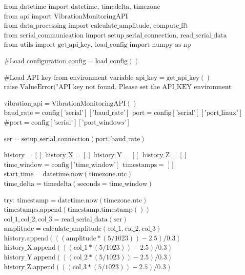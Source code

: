 \begin{algorithmic}[1]
	\STATE $\text{from datetime import datetime, timedelta, timezone}$
	\STATE $\text{from api import VibrationMonitoringAPI}$
	\STATE $\text{from data\_processing import calculate\_amplitude, compute\_fft}$
	\STATE $\text{from serial\_communication import setup\_serial\_connection, read\_serial\_data}$
	\STATE $\text{from utils import get\_api\_key, load\_config}$
	\STATE $\text{import numpy as np}$
	
	\STATE
	\STATE $\text{\# Load configuration}$
	\STATE $\text{config} = \text{load\_config}()$
	
	\STATE $\text{\# Load API key from environment variable}$
	\STATE $\text{api\_key} = \text{get\_api\_key}()$
	\STATE $\text{raise ValueError("API key not found. Please set the API\_KEY environment variable.")}$
	\ENDIF
	
	\STATE $\text{vibration\_api} = \text{VibrationMonitoringAPI}()$
	\STATE $\text{baud\_rate} = \text{config}[\text{'serial'}][\text{'baud\_rate'}]$
	\STATE $\text{port} = \text{config}[\text{'serial'}][\text{'port\_linux'}]$
	\STATE $\text{\# port} = \text{config}[\text{'serial'}][\text{'port\_windows'}]$
	
	\STATE $\text{ser} = \text{setup\_serial\_connection}(\text{port}, \text{baud\_rate})$
	
	\STATE $\text{history} = [ ]$
	\STATE $\text{history\_X} = [ ]$
	\STATE $\text{history\_Y} = [ ]$
	\STATE $\text{history\_Z} = [ ]$
	\STATE $\text{time\_window} = \text{config}[\text{'time\_window'}]$
	\STATE $\text{timestamps} = [ ]$
	\STATE $\text{start\_time} = \text{datetime.now}(\text{timezone.utc})$
	\STATE $\text{time\_delta} = \text{timedelta}(\text{seconds} = \text{time\_window})$
	
	\STATE
	\STATE $\text{try:}$
	\STATE $\text{timestamp} = \text{datetime.now}(\text{timezone.utc})$
	\STATE $\text{timestamps.append}(\text{timestamp.timestamp}())$
	\STATE $\text{col\_1}, \text{col\_2}, \text{col\_3} = \text{read\_serial\_data}(\text{ser})$
	\STATE $\text{amplitude} = \text{calculate\_amplitude}(\text{col\_1}, \text{col\_2}, \text{col\_3})$
	\STATE $\text{history.append}(((\text{amplitude} * (5 / 1023)) - 2.5) / 0.3)$
	\STATE $\text{history\_X.append}(((\text{col\_1} * (5 / 1023)) - 2.5) / 0.3)$
	\STATE $\text{history\_Y.append}(((\text{col\_2} * (5 / 1023)) - 2.5) / 0.3)$
	\STATE $\text{history\_Z.append}(((\text{col\_3} * (5 / 1023)) - 2.5) / 0.3)$
	\ENDWHILE
	

\end{algorithmic}
